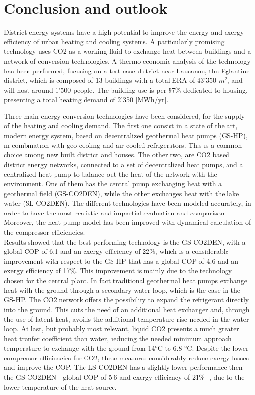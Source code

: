 \documentclass{article}
\begin{document}
\newpage
\section{Conclusion and outlook}
District energy systems have a high potential to improve the energy and exergy efficiency of urban heating and cooling systems. A particularly promising technology uses CO2 as a working fluid to exchange heat between buildings and a network of conversion technologies. A thermo-economic analysis of the technology has been performed, focusing on a test case district near Lausanne, the Eglantine district, which is composed of 13 buildings with a total ERA of  43'350 $m^2$, and will host around 1'500 people. The building use is per 97\% dedicated to housing, presenting a total heating demand of 2'350 [MWh/yr].

Three main energy conversion technologies have been considered, for the supply of the heating and cooling demand. The first one consist in a state of the art, modern energy system, based on decentralized geothermal heat pumps (GS-HP), in combination with geo-cooling and air-cooled refrigerators. This is a common choice among new built district and houses. The other two, are CO2 based district energy networks, connected to a set of decentralized heat pumps, and a centralized heat pump to balance out the heat of the network with the environment. One of them has the central pump exchanging heat with a geothermal field (GS-CO2DEN), while the other exchanges heat with the lake water (SL-CO2DEN). The different technologies have been modeled accurately, in order to have the most realistic and impartial evaluation and comparison. Moreover, the heat pump model has been improved with dynamical calculation of the compressor efficiencies.\\

Results showed that the best performing technology is the GS-CO2DEN, with a global COP of 6.1 and an exergy efficiency of 22\%, which is a considerable improvement with respect to the GS-HP that has a global COP of 4.6 and an exergy efficiency of 17\%. This improvement is mainly due to the technology chosen for the central plant. In fact traditional geothermal heat pumps exchange heat with the ground through a secondary water loop, which is the case in the GS-HP. The CO2 network offers the possibility to expand the refrigerant directly into the ground. This cuts the need of an additional heat exchanger and, through the use of latent heat, avoids the additional temperature rise needed in the water loop. At last, but probably most relevant, liquid CO2 presents a much greater heat tranfer coefficient than water, reducing the needed minimum approach temperature to exchange with the ground from 14\si{\celsius} to 6.8 \si{\celsius}. Despite the lower compressor efficiencies for CO2, these measures considerably reduce exergy losses and improve the COP. The LS-CO2DEN has a slightly lower performance then the GS-CO2DEN - global COP of 5.6 and exergy efficiency of 21\% -, due to the lower temperature of the heat source.
\end{document}
